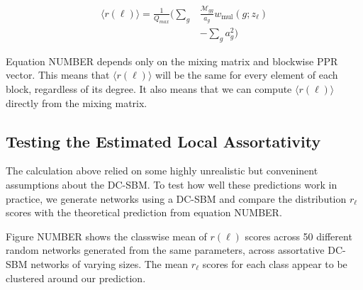 \documentclass[12pt]{article}
\begin{document}
\begin{equation}
  \begin{aligned}
    \langle r(\ell) \rangle = \frac{1}{Q_{max}}\bigg ( \sum_g &\frac{\mathcal{M}_{gg}}{a_g} w_\text{mul}(g; z_\ell)\\ 
    & - \sum_g a_g^2 \bigg )
  \end{aligned}
\end{equation}

Equation NUMBER depends only on the mixing matrix and blockwise PPR vector.  This means that $\langle r(\ell) \rangle$ will be the same for every element of each block, regardless of its degree.  It also means that we can compute $\langle r(\ell) \rangle$ directly from the mixing matrix.

\subsection{Testing the Estimated Local Assortativity}
The calculation above relied on some highly unrealistic but conveninent assumptions about the DC-SBM.  To test how well these predictions work in practice, we generate networks using a DC-SBM and compare the distribution $r_\ell$ scores with the theoretical prediction from equation NUMBER.


Figure NUMBER shows the classwise mean of $r(\ell)$ scores across 50 different random networks generated from the same parameters, across assortative DC-SBM networks of varying sizes.  The mean $r_\ell$ scores for each class appear to be clustered around our prediction.  
\end{document}
